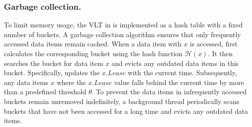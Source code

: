 



{
\color{blue}
\subsubsection{Garbage collection.} 
To limit memory usage, the VLT in \sysname is implemented as a hash table with a fixed number of buckets. A garbage collection algorithm ensures that only frequently accessed data items remain cached. 
When a data item with $x$ is accessed, \sysname first calculates the corresponding bucket using the hash function $\mathcal{H}(x)$. It then searches the bucket for data item $x$ and evicts any outdated data items in this bucket. Specifically, \sysname updates the $x.Lease$ with the current time. Subsequently, any data items $x$ where the $x.Lease$ value falls behind the current time by more than a predefined threshold $\theta$. 
To prevent the data items in infrequently accessed buckets remain unremoved indefinitely, a background thread periodically scans buckets that have not been accessed for a long time and evicts any outdated data items.
}

